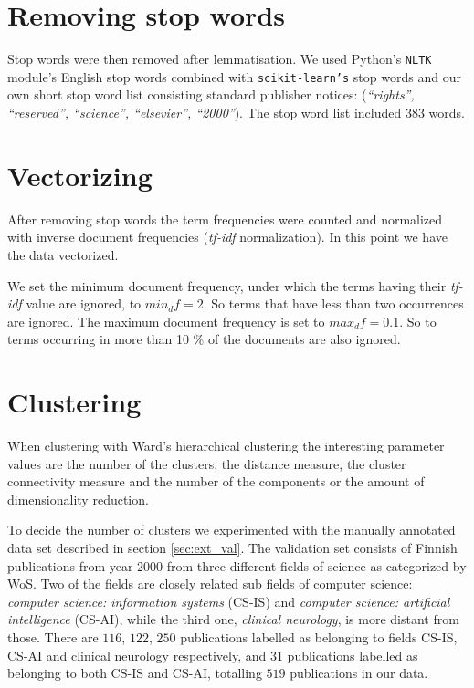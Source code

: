 \section{Removing stop words}
Stop words were then removed after lemmatisation. We used Python's
\texttt{NLTK} module's English stop words combined with 
\texttt{scikit-learn's} stop words and our own short stop word 
list consisting standard publisher notices: (\emph{``rights'', 
``reserved'', ``science'', ``elsevier'', ``2000''}). The stop word 
list included $383$ words.


\section{Vectorizing}
After removing stop words the term frequencies were counted and 
normalized with inverse document frequencies (\emph{tf-idf} 
normalization). 
In this point we have the data vectorized.

We set the minimum document frequency, under which the terms 
having their \emph{tf-idf} value are ignored, to $min_df=2$. So 
terms that have less than two occurrences are ignored. The maximum 
document frequency is set to $max_df=0.1$. So to terms 
occurring in more than 10 \% of the documents are also ignored.



\section{Clustering}
\label{sec:4clustering}
When clustering with Ward's hierarchical clustering the 
interesting parameter values are the number of the clusters, 
the distance measure, the cluster connectivity measure and the 
number of the components or the amount of dimensionality 
reduction. 

To decide the number of clusters we experimented with the manually 
annotated data set described in section \ref{sec:ext_val}.
The validation set consists of Finnish publications from year 2000
from three different fields of science as categorized by WoS.
Two of the fields are closely related sub fields of computer
science: \emph{computer science: information systems} (CS-IS) and 
\emph{computer science: 
artificial intelligence} (CS-AI), while the third one, 
\emph{clinical neurology}, is more distant from those. There are 
$116$, $122$, $250$ publications labelled as belonging to fields 
CS-IS, CS-AI and clinical neurology respectively, and $31$ 
publications labelled as belonging to both CS-IS and CS-AI, 
totalling $519$ publications in our data.

